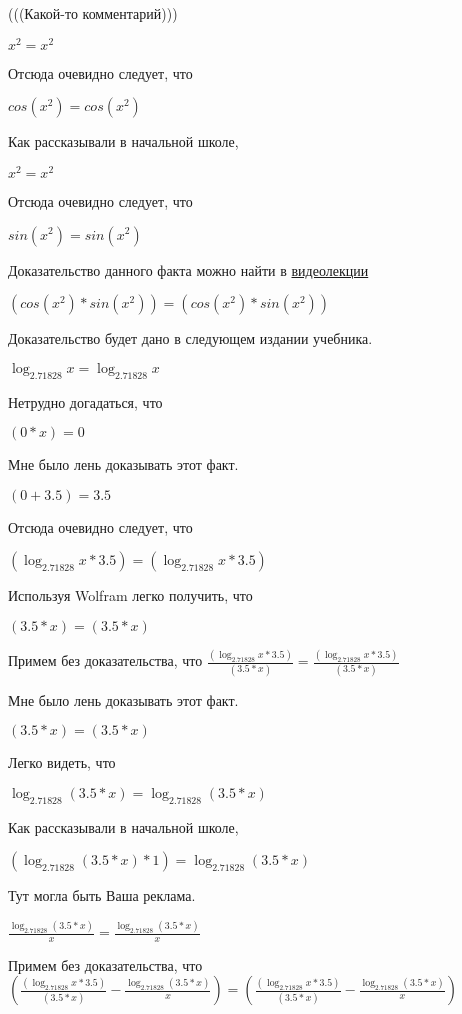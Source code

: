 \documentclass[12pt,a4paper,fleqn]{article}
\theoremstyle{definition}
\begin{document}
(((Какой-то комментарий)))

${ x }^{ 2 } = { x }^{ 2 }$

Отсюда очевидно следует, что

$cos({ x }^{ 2 }) = cos({ x }^{ 2 })$

Как рассказывали в начальной школе,

${ x }^{ 2 } = { x }^{ 2 }$

Отсюда очевидно следует, что

$sin({ x }^{ 2 }) = sin({ x }^{ 2 })$

Доказательство данного факта можно найти в \href{https://www.youtube.com/watch?v=dQw4w9WgXcQ}{видеолекции}

$(cos({ x }^{ 2 }) * sin({ x }^{ 2 })) = (cos({ x }^{ 2 }) * sin({ x }^{ 2 }))$

Доказательство будет дано в следующем издании учебника.

$\log_{ 2.71828 }{ x } = \log_{ 2.71828 }{ x }$

Нетрудно догадаться, что

$( 0  *  x ) =  0 $

Мне было лень доказывать этот факт.

$( 0  +  3.5 ) =  3.5 $

Отсюда очевидно следует, что

$(\log_{ 2.71828 }{ x } *  3.5 ) = (\log_{ 2.71828 }{ x } *  3.5 )$

Используя Wolfram легко получить, что

$( 3.5  *  x ) = ( 3.5  *  x )$

Примем без доказательства, что
$\frac{(\log_{ 2.71828 }{ x } *  3.5 )}{( 3.5  *  x )}
 = \frac{(\log_{ 2.71828 }{ x } *  3.5 )}{( 3.5  *  x )}
$

Мне было лень доказывать этот факт.

$( 3.5  *  x ) = ( 3.5  *  x )$

Легко видеть, что

$\log_{ 2.71828 }{( 3.5  *  x )} = \log_{ 2.71828 }{( 3.5  *  x )}$

Как рассказывали в начальной школе,

$(\log_{ 2.71828 }{( 3.5  *  x )} *  1 ) = \log_{ 2.71828 }{( 3.5  *  x )}$

Тут могла быть Ваша реклама.

$\frac{\log_{ 2.71828 }{( 3.5  *  x )}}{ x }
 = \frac{\log_{ 2.71828 }{( 3.5  *  x )}}{ x }
$

Примем без доказательства, что
$(\frac{(\log_{ 2.71828 }{ x } *  3.5 )}{( 3.5  *  x )}
 - \frac{\log_{ 2.71828 }{( 3.5  *  x )}}{ x }
) = (\frac{(\log_{ 2.71828 }{ x } *  3.5 )}{( 3.5  *  x )}
 - \frac{\log_{ 2.71828 }{( 3.5  *  x )}}{ x }
)$
\end{document}
